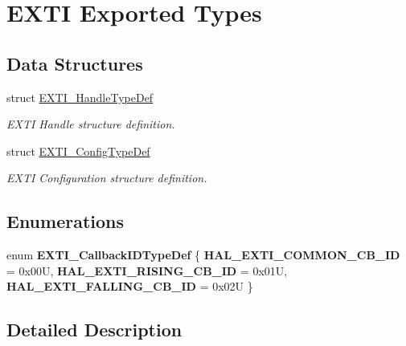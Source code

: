 \hypertarget{group___e_x_t_i___exported___types}{}\section{E\+X\+TI Exported Types}
\label{group___e_x_t_i___exported___types}
\subsection*{Data Structures}
\begin{DoxyCompactItemize}
\item 
struct \hyperlink{struct_e_x_t_i___handle_type_def}{E\+X\+T\+I\+\_\+\+Handle\+Type\+Def}
\begin{DoxyCompactList}\small\item\em E\+X\+TI Handle structure definition. \end{DoxyCompactList}\item 
struct \hyperlink{struct_e_x_t_i___config_type_def}{E\+X\+T\+I\+\_\+\+Config\+Type\+Def}
\begin{DoxyCompactList}\small\item\em E\+X\+TI Configuration structure definition. \end{DoxyCompactList}\end{DoxyCompactItemize}
\subsection*{Enumerations}
\begin{DoxyCompactItemize}
\item 
\mbox{\label{group___e_x_t_i___exported___types_ga0ff36e8796a6ad3f2fc211e534c54c0e}} 
enum {\bfseries E\+X\+T\+I\+\_\+\+Callback\+I\+D\+Type\+Def} \{ {\bfseries H\+A\+L\+\_\+\+E\+X\+T\+I\+\_\+\+C\+O\+M\+M\+O\+N\+\_\+\+C\+B\+\_\+\+ID} = 0x00U, 
{\bfseries H\+A\+L\+\_\+\+E\+X\+T\+I\+\_\+\+R\+I\+S\+I\+N\+G\+\_\+\+C\+B\+\_\+\+ID} = 0x01U, 
{\bfseries H\+A\+L\+\_\+\+E\+X\+T\+I\+\_\+\+F\+A\+L\+L\+I\+N\+G\+\_\+\+C\+B\+\_\+\+ID} = 0x02U
 \}
\end{DoxyCompactItemize}


\subsection{Detailed Description}
